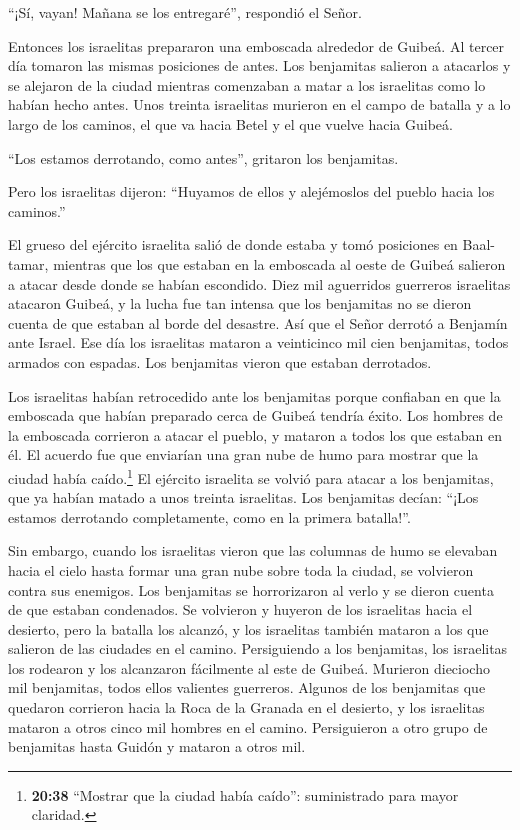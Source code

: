 ``¡Sí, vayan! Mañana se los entregaré'', respondió el Señor.

 Entonces los israelitas prepararon una emboscada alrededor
de Guibeá.  Al tercer día tomaron las mismas posiciones de
antes.  Los benjamitas salieron a atacarlos y se alejaron
de la ciudad mientras comenzaban a matar a los israelitas como lo habían
hecho antes. Unos treinta israelitas murieron en el campo de batalla y a
lo largo de los caminos, el que va hacia Betel y el que vuelve hacia
Guibeá.

 ``Los estamos derrotando, como antes'', gritaron los
benjamitas.

Pero los israelitas dijeron: ``Huyamos de ellos y alejémoslos del pueblo
hacia los caminos.''

 El grueso del ejército israelita salió de donde estaba y
tomó posiciones en Baal-tamar, mientras que los que estaban en la
emboscada al oeste de Guibeá salieron a atacar desde donde se habían
escondido.  Diez mil aguerridos guerreros israelitas
atacaron Guibeá, y la lucha fue tan intensa que los benjamitas no se
dieron cuenta de que estaban al borde del desastre.  Así
que el Señor derrotó a Benjamín ante Israel. Ese día los israelitas
mataron a veinticinco mil cien benjamitas, todos armados con espadas.
 Los benjamitas vieron que estaban derrotados.

Los israelitas habían retrocedido ante los benjamitas porque confiaban
en que la emboscada que habían preparado cerca de Guibeá tendría éxito.
 Los hombres de la emboscada corrieron a atacar el pueblo,
y mataron a todos los que estaban en él.  El acuerdo fue
que enviarían una gran nube de humo para mostrar que la ciudad había
caído.\footnote{\textbf{20:38} ``Mostrar que la ciudad había caído'':
  suministrado para mayor claridad.}  El ejército israelita
se volvió para atacar a los benjamitas, que ya habían matado a unos
treinta israelitas. Los benjamitas decían: ``¡Los estamos derrotando
completamente, como en la primera batalla!''.

 Sin embargo, cuando los israelitas vieron que las columnas
de humo se elevaban hacia el cielo hasta formar una gran nube sobre toda
la ciudad,  se volvieron contra sus enemigos. Los
benjamitas se horrorizaron al verlo y se dieron cuenta de que estaban
condenados.  Se volvieron y huyeron de los israelitas hacia
el desierto, pero la batalla los alcanzó, y los israelitas también
mataron a los que salieron de las ciudades en el camino. 
Persiguiendo a los benjamitas, los israelitas los rodearon y los
alcanzaron fácilmente al este de Guibeá.  Murieron
dieciocho mil benjamitas, todos ellos valientes guerreros. 
Algunos de los benjamitas que quedaron corrieron hacia la Roca de la
Granada en el desierto, y los israelitas mataron a otros cinco mil
hombres en el camino. Persiguieron a otro grupo de benjamitas hasta
Guidón y mataron a otros mil.

